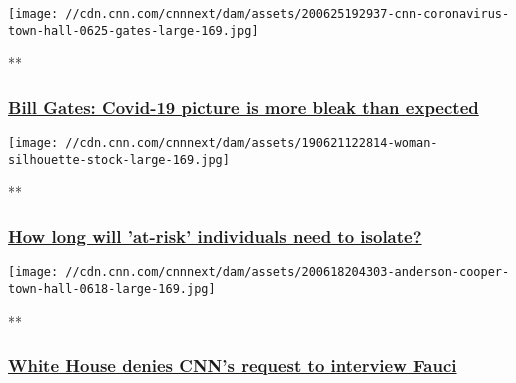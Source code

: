 \href{/videos/health/2020/06/26/bill-gates-coronavirus-us-town-hall-sot-vpx.cnn/video/playlists/cnn-coronavirus-town-hall/}{}

\texttt{[image: //cdn.cnn.com/cnnnext/dam/assets/200625192937-cnn-coronavirus-town-hall-0625-gates-large-169.jpg]}

**

\hypertarget{bill-gates-covid-19-picture-is-more-bleak-than-expected}{%
\subsubsection{\texorpdfstring{\href{/videos/health/2020/06/26/bill-gates-coronavirus-us-town-hall-sot-vpx.cnn/video/playlists/cnn-coronavirus-town-hall/}{Bill
Gates: Covid-19 picture is more bleak than
expected}}{Bill Gates: Covid-19 picture is more bleak than expected}}\label{bill-gates-covid-19-picture-is-more-bleak-than-expected}}

\href{/videos/health/2020/06/19/at-risk-individuals-isolate-dr-wen-town-hall-sot-vpx.cnn/video/playlists/cnn-coronavirus-town-hall/}{}

\texttt{[image: //cdn.cnn.com/cnnnext/dam/assets/190621122814-woman-silhouette-stock-large-169.jpg]}

**

\hypertarget{how-long-will-at-risk-individuals-need-to-isolate}{%
\subsubsection{\texorpdfstring{\href{/videos/health/2020/06/19/at-risk-individuals-isolate-dr-wen-town-hall-sot-vpx.cnn/video/playlists/cnn-coronavirus-town-hall/}{How
long will 'at-risk' individuals need to
isolate?}}{How long will 'at-risk' individuals need to isolate?}}\label{how-long-will-at-risk-individuals-need-to-isolate}}

\href{/videos/health/2020/06/19/coronavirus-town-hall-cooper-fauci-invitation-vpx.cnn/video/playlists/cnn-coronavirus-town-hall/}{}

\texttt{[image: //cdn.cnn.com/cnnnext/dam/assets/200618204303-anderson-cooper-town-hall-0618-large-169.jpg]}

**

\hypertarget{white-house-denies-cnns-request-to-interview-fauci}{%
\subsubsection{\texorpdfstring{\href{/videos/health/2020/06/19/coronavirus-town-hall-cooper-fauci-invitation-vpx.cnn/video/playlists/cnn-coronavirus-town-hall/}{White
House denies CNN's request to interview
Fauci}}{White House denies CNN's request to interview Fauci}}\label{white-house-denies-cnns-request-to-interview-fauci}}


